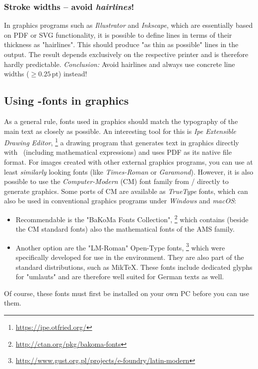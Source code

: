 \subsubsection{Stroke widths -- avoid \emph{hairlines}!}

In graphics programs such as \emph{Illustrator} and \emph{Inkscape}, which
are essentially based on PDF or SVG functionality, it is possible to define
lines in terms of their thickness as "hairlines". This should produce "as
thin as possible" lines in the output. The result depends exclusively on the
respective printer and is therefore hardly predictable. \emph{Conclusion:}
Avoid hairlines and always use concrete line widths ($\geq 0.25\,
\mathrm{pt}$) instead!

\subsection{Using \tex-fonts in graphics}
\label{sec:TexFontsInGraphics}

As a general rule, fonts used in graphics should match the typography of the
main text as closely as possible. An interesting tool for this is \emph{Ipe
Extensible Drawing Editor},%
\footnote{\url{https://ipe.otfried.org/}}
a drawing program that generates text in graphics directly with \latex\
(including mathematical expressions) and uses PDF as its native file format.
For images created with other external graphics programs, you can use at
least \emph{similarly} looking fonts (like \emph{Times-Roman} or
\emph{Garamond}). However, it is also possible to use the
\emph{Computer-Modern} (CM) font family from {\tex}/{\latex} directly to
generate graphics. Some ports of CM are available as \emph{TrueType} fonts,
which can also be used in conventional graphics programs under \emph{Windows}
and \emph{macOS}:
%
\begin{itemize}
    \item
    Recommendable is the "BaKoMa Fonts Collection",%
    \footnote{\url{http://ctan.org/pkg/bakoma-fonts}}
    which contains (beside the CM standard fonts) also the mathematical fonts
    of the
    AMS family.
    \item
    Another option are the "LM-Roman" Open-Type fonts,%
    \footnote{\url{http://www.gust.org.pl/projects/e-foundry/latin-modern}}
    which were specifically developed for use in the \latex environment.
    They are also part of the standard \latex distributions, such as MikTeX.
    These fonts include dedicated glyphs for "umlauts" and are therefore well
    suited for German texts as well.
\end{itemize}
%
Of course, these fonts must first be installed on your own PC before you can
use them.

